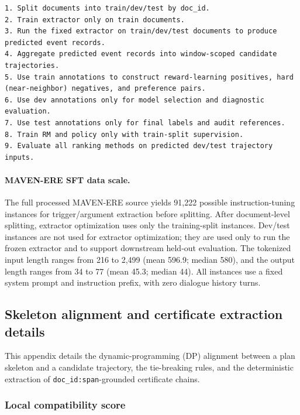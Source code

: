 \documentclass{article}
\begin{document}
\begin{lstlisting}[caption={Leakage-controlled data flow for one target corpus.},label={lst:data_flow}]
1. Split documents into train/dev/test by doc_id.
2. Train extractor only on train documents.
3. Run the fixed extractor on train/dev/test documents to produce predicted event records.
4. Aggregate predicted event records into window-scoped candidate trajectories.
5. Use train annotations to construct reward-learning positives, hard (near-neighbor) negatives, and preference pairs.
6. Use dev annotations only for model selection and diagnostic evaluation.
7. Use test annotations only for final labels and audit references.
8. Train RM and policy only with train-split supervision.
9. Evaluate all ranking methods on predicted dev/test trajectory inputs.
\end{lstlisting}

\paragraph{MAVEN-ERE SFT data scale.}
The full processed MAVEN-ERE source yields 91,222 possible instruction-tuning instances for trigger/argument extraction before splitting.
After document-level splitting, extractor optimization uses only the training-split instances.
Dev/test instances are not used for extractor optimization; they are used only to run the frozen extractor and to support downstream held-out evaluation.
The tokenized input length ranges from 216 to 2,499 (mean 596.9; median 580), and the output length ranges from 34 to 77 (mean 45.3; median 44).
All instances use a fixed system prompt and instruction prefix, with zero dialogue history turns.

\subsection{Skeleton alignment and certificate extraction details}
\label{sec:app_alignment}

This appendix details the dynamic-programming (DP) alignment between a plan skeleton and a candidate trajectory, the tie-breaking rules, and the deterministic extraction of \texttt{doc\_id:span}-grounded certificate chains.

\subsubsection{Local compatibility score}
\label{sec:app_alignment_match}
\end{document}

